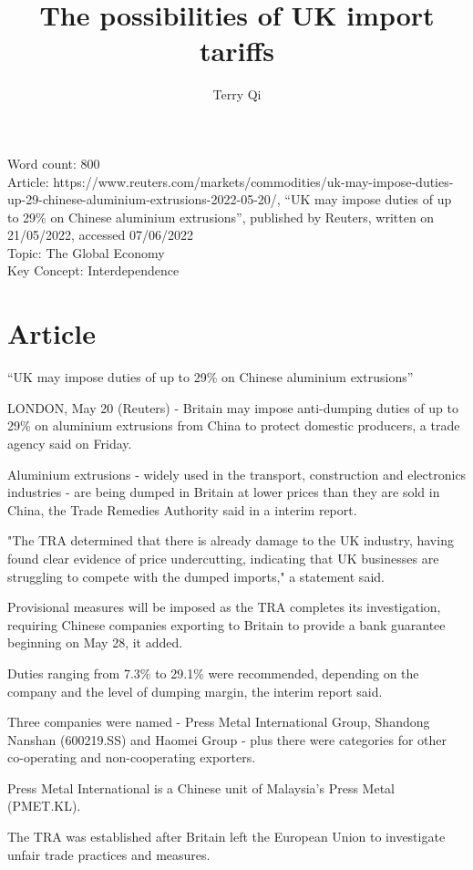 \documentclass[a4paper,12pt]{article}
\title{The possibilities of UK import tariffs}
\author{Terry Qi}
\begin{document}
\maketitle
Word count: 800\\
Article: https://www.reuters.com/markets/commodities/uk-may-impose-duties-up-29-chinese-aluminium-extrusions-2022-05-20/, ``UK may impose duties of up to 29\% on Chinese aluminium extrusions'', published by Reuters, written on 21/05/2022, accessed 07/06/2022\\
Topic: The Global Economy\\
Key Concept: Interdependence

\newpage

\section*{Article}
``UK may impose duties of up to 29\% on Chinese aluminium extrusions''

LONDON, May 20 (Reuters) - Britain may impose anti-dumping duties of up to 29\% on aluminium extrusions from China to protect domestic producers, a trade agency said on Friday.

Aluminium extrusions - widely used in the transport, construction and electronics industries - are being dumped in Britain at lower prices than they are sold in China, the Trade Remedies Authority said in a interim report.

"The TRA determined that there is already damage to the UK industry, having found clear evidence of price undercutting, indicating that UK businesses are struggling to compete with the dumped imports," a statement said.

Provisional measures will be imposed as the TRA completes its investigation, requiring Chinese companies exporting to Britain to provide a bank guarantee beginning on May 28, it added.

Duties ranging from 7.3\% to 29.1\% were recommended, depending on the company and the level of dumping margin, the interim report said.

Three companies were named - Press Metal International Group, Shandong Nanshan (600219.SS) and Haomei Group - plus there were categories for other co-operating and non-cooperating exporters.

Press Metal International is a Chinese unit of Malaysia's Press Metal (PMET.KL).

The TRA was established after Britain left the European Union to investigate unfair trade practices and measures.
\end{document}
